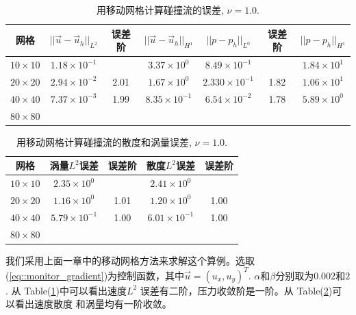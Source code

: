           \begin{table}[!htbp]
            \centering
            \begin{tabular}{ccccccc} \hline
              网格   & $||\vec{u} - \vec{u}_h ||_{L^2}$ & 误差阶 &$||\vec{u} -
              \vec{u}_h ||_{H^1}$ & $||p - p_h||_{L^0}$ & 误差阶 &$||p -
              p_h||_{H^1}$  \\ \hline
              $10 \times 10$   &   $1.18 \times 10^{-1}$   &  &  $3.37 \times
              10^0$     &   $8.49 \times 10^{-1}$ & & $1.84 \times 10^1$    \\
              $20 \times 20 $   &   $2.94 \times 10^{-2}$   & 2.01  &  $1.67 \times
              10^0$     &   $2.330 \times 10^{-1}$ & 1.82 & $1.06 \times 10^1$   \\
              $40 \times 40 $   &   $7.37 \times 10^{-3}$   & 1.99  & $8.35 \times
              10^{-1}$  &   $6.54 \times 10^{-2}$ & 1.78 & $5.89 \times 10^0$   \\
              $80 \times 80 $   &   &  &  & &  &  \\ \hline
            \end{tabular}
            \caption{\small 用移动网格计算碰撞流的误差, $\nu = 1.0$.}
            \label{tab::colliding_moving_error}
          \end{table}

          \begin{table}[!htbp]
            \centering
            \begin{tabular}{ccccc} \hline
              网格   & 涡量$L^2$误差 & 误差阶 & 散度$L^2$误差 & 误差阶\\ \hline
              $10 \times 10$    &   $2.35 \times 10^{0}$   &  &   $2.41 \times
              10^0$ &  \\
              $20 \times 20 $   &   $1.16 \times 10^{0}$  & 1.01  &   $1.20 \times
              10^0$ & 1.00 \\
              $40 \times 40 $   &   $5.79 \times 10^{-1}$ & 1.00  &   $6.01 \times
              10^{-1}$ &  1.00 \\
              $80 \times 80 $   &  &   & &  \\ \hline
            \end{tabular}
            \caption{\small 用移动网格计算碰撞流的散度和涡量误差, $\nu = 1.0$.}
            \label{tab::colliding_moving_div_error}
          \end{table}

          我们采用上面一章中的移动网格方法来求解这个算例。选取
          (\ref{eq::monitor_gradient})为控制函数，其中$\vec{u} = (u_x,
          u_y)^T$. $\alpha$和$\beta$分别取为$0.002$和$2$. 从
          Table(\ref{tab::colliding_moving_error})中可以看出速度$L^2$
          误差有二阶，压力收敛阶是一阶。从
          Table(\ref{tab::colliding_moving_div_error})可以看出速度散度
          和涡量均有一阶收敛。

